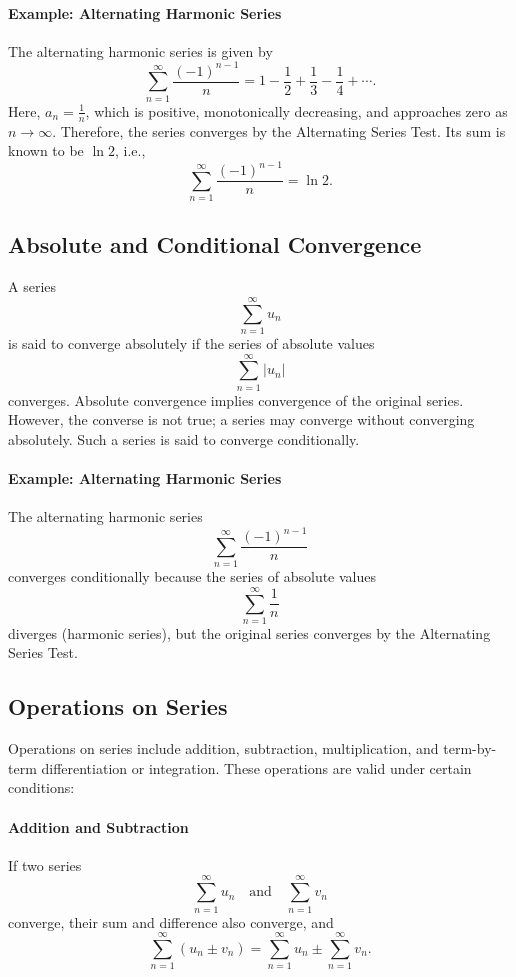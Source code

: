 \documentclass[12pt]{article}
\begin{document}
\paragraph{Example: Alternating Harmonic Series}
The alternating harmonic series is given by
\[
\sum_{n=1}^\infty \frac{(-1)^{n-1}}{n} = 1 - \frac{1}{2} + \frac{1}{3} - \frac{1}{4} + \cdots.
\]
Here, \(a_n = \frac{1}{n}\), which is positive, monotonically decreasing, and approaches zero as \(n \to \infty\). Therefore, the series converges by the Alternating Series Test. Its sum is known to be \(\ln 2\), i.e.,
\[
\sum_{n=1}^\infty \frac{(-1)^{n-1}}{n} = \ln 2.
\]

\subsection{Absolute and Conditional Convergence}
A series 
\[
\sum_{n=1}^\infty u_n
\]
is said to converge absolutely if the series of absolute values 
\[
\sum_{n=1}^\infty |u_n|
\]
converges. Absolute convergence implies convergence of the original series. However, the converse is not true; a series may converge without converging absolutely. Such a series is said to converge conditionally.

\paragraph{Example: Alternating Harmonic Series}
The alternating harmonic series 
\[
\sum_{n=1}^\infty \frac{(-1)^{n-1}}{n}
\]
converges conditionally because the series of absolute values 
\[
\sum_{n=1}^\infty \frac{1}{n}
\]
diverges (harmonic series), but the original series converges by the Alternating Series Test.

\subsection{Operations on Series}
Operations on series include addition, subtraction, multiplication, and term-by-term differentiation or integration. These operations are valid under certain conditions:

\paragraph{Addition and Subtraction}
If two series 
\[
\sum_{n=1}^\infty u_n \quad \text{and} \quad \sum_{n=1}^\infty v_n
\]
converge, their sum and difference also converge, and
\[
\sum_{n=1}^\infty (u_n \pm v_n) = \sum_{n=1}^\infty u_n \pm \sum_{n=1}^\infty v_n.
\]
\end{document}
